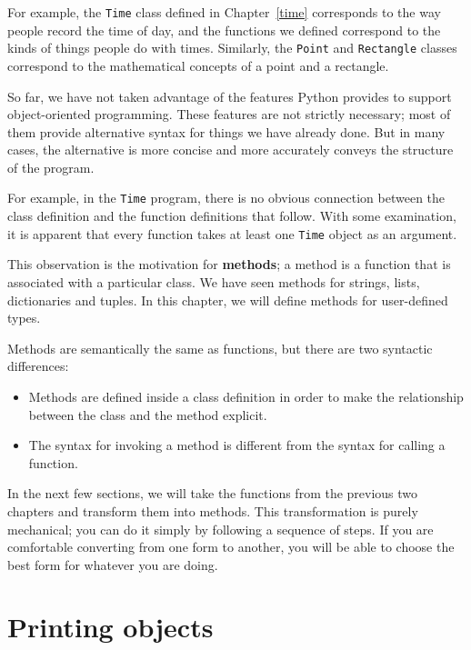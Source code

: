 \documentclass[10pt]{book}
\begin{document}
\begin{CJK}{UTF8}{gbsn}
\begin{itemize}
\end{itemize}

For example, the {\tt Time} class defined in Chapter~\ref{time}
corresponds to the way people record the time of day, and the
functions we defined correspond to the kinds of things people do with
times.  Similarly, the {\tt Point} and {\tt Rectangle} classes
correspond to the mathematical concepts of a point and a rectangle.

So far, we have not taken advantage of the features Python provides to
support object-oriented programming.  These
features are not strictly necessary; most of them provide
alternative syntax for things we have already done.  But in many cases,
the alternative is more concise and more accurately conveys the
structure of the program.

For example, in the {\tt Time} program, there is no obvious
connection between the class definition and the function definitions
that follow.  With some examination, it is apparent that every function
takes at least one {\tt Time} object as an argument.

This observation is the motivation for {\bf methods}; a method is
a function that is associated with a particular class.
We have seen methods for strings, lists, dictionaries and tuples.
In this chapter, we will define methods for user-defined types.

Methods are semantically the same as functions, but there are
two syntactic differences:

\begin{itemize}

\item Methods are defined inside a class definition in order
to make the relationship between the class and the method explicit.

\item The syntax for invoking a method is different from the
syntax for calling a function.

\end{itemize}

In the next few sections, we will take the functions from the previous
two chapters and transform them into methods.  This transformation is
purely mechanical; you can do it simply by following a sequence of
steps.  If you are comfortable converting from one form to another,
you will be able to choose the best form for whatever you are doing.


\section{Printing objects}


\end{CJK}
\end{document}
